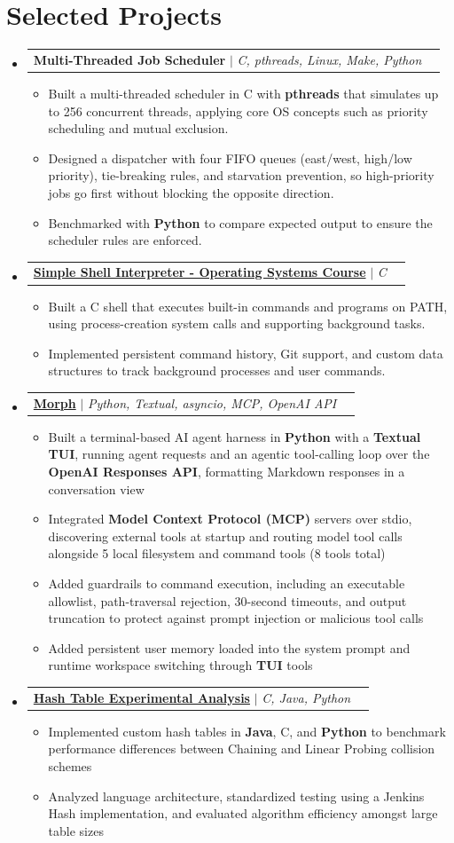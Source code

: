 \documentclass[letterpaper,10pt]{article}
\makeatletter
\newcommand{\resumeItem}[1]{
  \item\small{
    {#1 \vspace{-1pt}}
  }
}
\newcommand{\resumeProjectHeading}[2]{
    \item
    \begin{tabularx}{0.97\textwidth}{@{}Xr@{}}
      \small#1 & #2 \\
    \end{tabularx}\vspace{-6pt}
}
\newcommand{\resumeSubHeadingListStart}{\begin{itemize}[leftmargin=0.15in, label={}]}
\newcommand{\resumeSubHeadingListEnd}{\end{itemize}}
\newcommand{\resumeItemListStart}{\begin{itemize}[label=$\bullet$, itemsep=0.75pt, topsep=0pt, parsep=0pt]}
\newcommand{\resumeItemListEnd}{\end{itemize}\vspace{-2pt}}
\makeatother
\begin{document}
\section{Selected Projects}
\resumeSubHeadingListStart
\resumeProjectHeading{\textbf{Multi-Threaded Job Scheduler} $|$ \emph{C, pthreads, Linux, Make, Python}}{}
\resumeItemListStart
  \resumeItem{Built a multi-threaded scheduler in C with \textbf{pthreads} that simulates up to 256 concurrent threads, applying core OS concepts such as priority scheduling and mutual exclusion.}
  \resumeItem{Designed a dispatcher with four FIFO queues (east/west, high/low priority), tie-breaking rules, and starvation prevention, so high-priority jobs go first without blocking the opposite direction.}
  \resumeItem{Benchmarked with \textbf{Python} to compare expected output to ensure the scheduler rules are enforced.}
\resumeItemListEnd
\resumeProjectHeading{\href{https://github.com/samnne/ssi}{\textbf{Simple Shell Interpreter - Operating Systems Course}} $|$ \emph{C}}{}
\resumeItemListStart
  \resumeItem{Built a C shell that executes built-in commands and programs on PATH, using process-creation system calls and supporting background tasks.}
  \resumeItem{Implemented persistent command history, Git support, and custom data structures to track background processes and user commands.}
\resumeItemListEnd
\resumeProjectHeading{\href{https://github.com/samnne/morph-ai}{\textbf{Morph}} $|$ \emph{Python, Textual, asyncio, MCP, OpenAI API}}{}
\resumeItemListStart
  \resumeItem{Built a terminal-based AI agent harness in \textbf{Python} with a \textbf{Textual} \textbf{TUI}, running agent requests and an agentic tool-calling loop over the \textbf{OpenAI Responses \textbf{API}}, formatting Markdown responses in a conversation view}
  \resumeItem{Integrated \textbf{Model Context Protocol (\textbf{MCP})} servers over stdio, discovering external tools at startup and routing model tool calls alongside 5 local filesystem and command tools (8 tools total)}
  \resumeItem{Added guardrails to command execution, including an executable allowlist, path-traversal rejection, 30-second timeouts, and output truncation to protect against prompt injection or malicious tool calls}
  \resumeItem{Added persistent user memory loaded into the system prompt and runtime workspace switching through \textbf{TUI} tools}
\resumeItemListEnd
\resumeProjectHeading{\href{https://github.com/samnne/chaining_or_linear_probing}{\textbf{Hash Table Experimental Analysis}} $|$ \emph{C, Java, Python}}{}
\resumeItemListStart
  \resumeItem{Implemented custom hash tables in \textbf{Java}, C, and \textbf{Python} to benchmark performance differences between Chaining and Linear Probing collision schemes}
  \resumeItem{Analyzed language architecture, standardized testing using a Jenkins Hash implementation, and evaluated algorithm efficiency amongst large table sizes}
\resumeItemListEnd
\resumeSubHeadingListEnd
\end{document}
